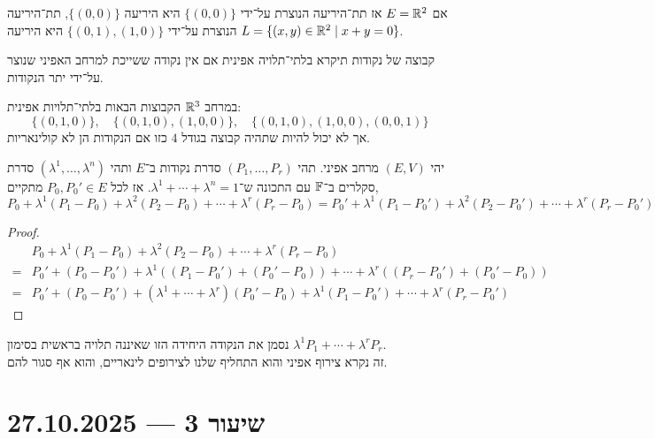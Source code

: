 \begin{example}
	אם $E = \mathbb{R}^2$ אז תת־היריעה הנוצרת על־ידי $\{ (0, 0) \}$ היא היריעה $\{ (0, 0) \}$, תת־היריעה הנוצרת על־ידי $\{ (0, 1), (1, 0) \}$ היא היריעה $L = \{ (x, y) \in \mathbb{R}^2 \mid x + y = 0 \}$.
\end{example}
\begin{definition}
	קבוצה של נקודות תיקרא בלתי־תלויה אפינית אם אין נקודה ששייכת למרחב האפיני שנוצר על־ידי יתר הנקודות.
\end{definition}
\begin{example}
	במרחב $\mathbb{R}^3$ הקבוצות הבאות בלתי־תלויות אפינית:
	\[
		\{ (0, 1, 0) \},
		\quad
		\{ (0, 1, 0), (1, 0, 0) \},
		\quad
		\{ (0, 1, 0), (1, 0, 0), (0, 0, 1) \}
	\]
	אך לא יכול להיות שתהיה קבוצה בגודל $4$ כזו אם הנקודות הן לא קולינאריות.
\end{example}
\begin{theorem}
	יהי $(E, V)$ מרחב אפיני.
	תהי $(P_1, \ldots, P_r)$ סדרת נקודות ב־$E$ ותהי $(\lambda^1, \ldots, \lambda^n)$ סדרת סקלרים ב־$\mathbb{F}$ עם התכונה ש־$\lambda^1 + \cdots + \lambda^n = 1$.
	אז לכל $P_0, P_0' \in E$ מתקיים,
	\[
		P_0 + \lambda^1 (P_1 - P_0) + \lambda^2 (P_2 - P_0) + \cdots + \lambda^r (P_r - P_0)
		= P_0' + \lambda^1 (P_1 - P_0') + \lambda^2 (P_2 - P_0') + \cdots + \lambda^r (P_r - P_0')
	\]
\end{theorem}
\begin{proof}
	\begin{align*}
		& P_0 + \lambda^1 (P_1 - P_0) + \lambda^2 (P_2 - P_0) + \cdots + \lambda^r (P_r - P_0) \\
		= & P_0' + (P_0 - P_0') + \lambda^1 ((P_1 - P_0') + (P_0' - P_0)) + \cdots + \lambda^r ((P_r - P_0') + (P_0' - P_0)) \\
		= & P_0' + (P_0 - P_0') + (\lambda^1 + \cdots + \lambda^r) (P_0' - P_0) + \lambda^1 (P_1 - P_0') + \cdots + \lambda^r (P_r - P_0')
	\end{align*}
\end{proof}
\begin{notation}
	נסמן את הנקודה היחידה הזו שאיננה תלויה בראשית בסימון $\lambda^1 P_1 + \cdots + \lambda^r P_r$. \\
	זה נקרא צירוף אפיני והוא התחליף שלנו לצירופים לינאריים, והוא אף סגור להם.
\end{notation}

\section{שיעור 3 --- 27.10.2025}
